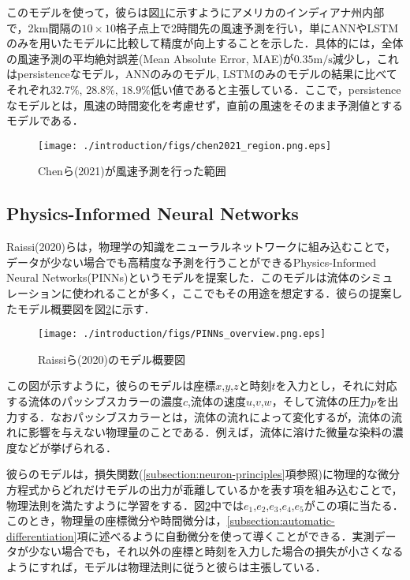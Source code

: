 このモデルを使って，彼らは図\ref{fig:chen2021_region}に示すようにアメリカのインディアナ州内部で，2km間隔の$10 \times 10$格子点上で2時間先の風速予測を行い，単にANNやLSTMのみを用いたモデルに比較して精度が向上することを示した．具体的には，全体の風速予測の平均絶対誤差(Mean Absolute Error, MAE)が$0.35 \mathrm{m/s}$減少し，これはpersistenceなモデル，ANNのみのモデル, LSTMのみのモデルの結果に比べてそれぞれ$32.7\%$, $28.8\%$, $18.9\%$低い値であると主張している．ここで，persistenceなモデルとは，風速の時間変化を考慮せず，直前の風速をそのまま予測値とするモデルである．
\begin{figure}[btp]
    \centering
    \texttt{[image: ./introduction/figs/chen2021\_region.png.eps]}
    \caption{Chenら(2021)が風速予測を行った範囲\cite{CHEN2021114451}}
    \label{fig:chen2021_region}
\end{figure}

\subsection{Physics-Informed Neural Networks}
Raissi(2020)らは，物理学の知識をニューラルネットワークに組み込むことで，データが少ない場合でも高精度な予測を行うことができるPhysics-Informed Neural Networks(PINNs)というモデルを提案した\cite{PINNs2020}．このモデルは流体のシミュレーションに使われることが多く\cite{app13126892}，ここでもその用途を想定する．彼らの提案したモデル概要図を図\ref{fig:pinns-overview}に示す．
\begin{figure}[btp]
    \centering
    \texttt{[image: ./introduction/figs/PINNs\_overview.png.eps]}
    \caption{Raissiら(2020)のモデル概要図\cite{PINNs2020}}
    \label{fig:pinns-overview}
\end{figure}
この図が示すように，彼らのモデルは座標$x$,$y$,$z$と時刻$t$を入力とし，それに対応する流体のパッシブスカラーの濃度$c$,流体の速度$u$,$v$,$w$，そして流体の圧力$p$を出力する．なおパッシブスカラーとは，流体の流れによって変化するが，流体の流れに影響を与えない物理量のことである．例えば，流体に溶けた微量な染料の濃度などが挙げられる\cite{Lesieur1990}．

彼らのモデルは，損失関数(\ref{subsection:neuron-principles}項参照)に物理的な微分方程式からどれだけモデルの出力が乖離しているかを表す項を組み込むことで，物理法則を満たすように学習をする．図\ref{fig:pinns-overview}中では$e_1$,$e_2$,$e_3$,$e_4$,$e_5$がこの項に当たる．このとき，物理量の座標微分や時間微分は，\ref{subsection:automatic-differentiation}項に述べるように自動微分を使って導くことができる．実測データが少ない場合でも，それ以外の座標と時刻を入力した場合の損失が小さくなるようにすれば，モデルは物理法則に従うと彼らは主張している．

